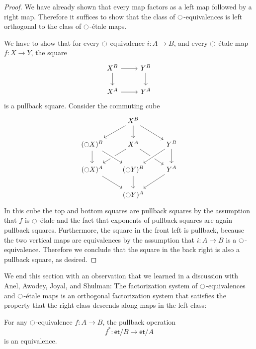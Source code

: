 \documentclass[9pt,twosided]{amsart}
\newcommand{\et}{\mathsf{et}}
\begin{document}
\begin{proof}
  We have already shown that every map factors as a left map followed by a right map. Therefore it suffices to show that the class of ${\ocircle}$-equivalences is left orthogonal to the class of ${\ocircle}$-\'etale maps.
  
We have to show that for every ${\ocircle}$-equivalence $i:A\to B$, and every ${\ocircle}$-\'etale map $f:X\to Y$, the square
\begin{equation*}
\begin{tikzcd}
X^B \arrow[r] \arrow[d] & Y^B \arrow[d] \\
X^A \arrow[r] & Y^A
\end{tikzcd}
\end{equation*}
is a pullback square. Consider the commuting cube
\begin{equation*}
\begin{tikzcd}
&[-1ex] X^B \arrow[dl] \arrow[d] \arrow[dr] \\
(\modal X)^B \arrow[d] & X^A \arrow[dl] \arrow[dr] & Y^B \arrow[d] \arrow[dl,crossing over] \\
(\modal X)^A \arrow[dr] & (\modal Y)^B \arrow[from=ul,crossing over] \arrow[d] & Y^A \arrow[dl] \\
& (\modal Y)^A
\end{tikzcd}
\end{equation*}
In this cube the top and bottom squares are pullback squares by the assumption that $f$ is ${\ocircle}$-\'etale and the fact that exponents of pullback squares are again pullback squares. Furthermore, the square in the front left is pullback, because the two vertical maps are equivalences by the assumption that $i:A\to B$ is a ${\ocircle}$-equivalence. Therefore we conclude that the square in the back right is also a pullback square, as desired.
\end{proof}

We end this section with an observation that we learned in a discussion with Anel, Awodey, Joyal, and Shulman: The factorization system of ${\ocircle}$-equivalences and ${\ocircle}$-\'etale maps is an orthogonal factorization system that satisfies the property that the right class descends along maps in the left class:

\begin{prp}
  For any ${\ocircle}$-equivalence $f:A\to B$, the pullback operation
  \begin{equation*}
    f^\ast : \et/B\to\et/A
  \end{equation*}
  is an equivalence.
\end{prp}
\end{document}
